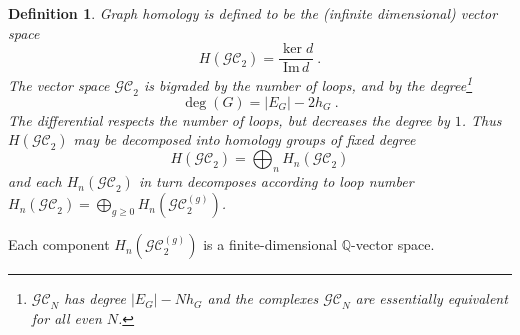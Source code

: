 \documentclass[12pt]{amsart}
\newcommand{\QQ}{{\mathbb Q}}
\theoremstyle{plain}
\newtheorem{defn}[thm]{Definition}
\newcommand{\GC}{\mathcal{GC}}
\newcommand{\0}{\color{blue}{\mathsf{0}}}
\begin{document}
\begin{defn} Graph homology is defined to be the (infinite dimensional) vector space
\[ H(\GC_2) = \frac{\ker d}{\mathrm{Im} \, d}  \ .\]
The vector space $\GC_2$ is bigraded by the number of loops, and by the \emph{degree}\footnote{$\GC_N$ has degree $ |E_G|- N h_G$ and the complexes $\GC_N$ are essentially equivalent for all even $N$.    }
\[ \deg(G) =   |E_G| -  2 h_G \ .\]
The differential respects the number of loops, but decreases the degree by $1$. Thus $H(\GC_2)$ may be decomposed into homology groups of fixed degree
\[ H(\GC_2) = \bigoplus_{n}  H_n(\GC_2) \]
and each $H_n(\GC_2)$ in turn decomposes according to loop number  $ H_n(\GC_2) = \bigoplus_{g\geq 0}  H_n(\GC^{(g)}_2)$. 
\end{defn}
Each component $ H_n(\GC^{(g)}_2)$ is a finite-dimensional $\QQ$-vector space.
\end{document}
